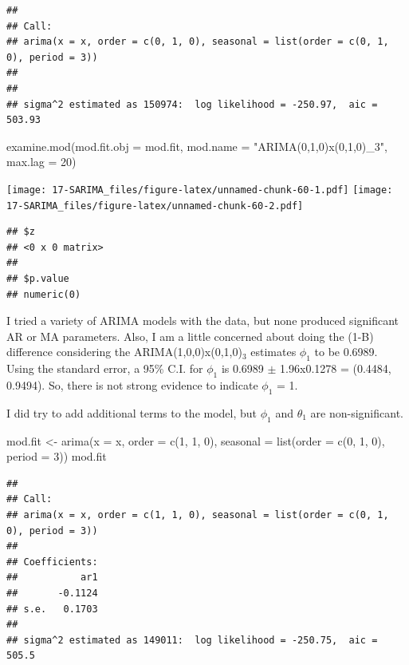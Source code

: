 \documentclass[
]{book}
\newenvironment{Shaded}{\begin{snugshade}}{\end{snugshade}}
\newcommand{\AttributeTok}[1]{\textcolor[rgb]{0.77,0.63,0.00}{#1}}
\newcommand{\DecValTok}[1]{\textcolor[rgb]{0.00,0.00,0.81}{#1}}
\newcommand{\FunctionTok}[1]{\textcolor[rgb]{0.00,0.00,0.00}{#1}}
\newcommand{\NormalTok}[1]{#1}
\newcommand{\OtherTok}[1]{\textcolor[rgb]{0.56,0.35,0.01}{#1}}
\newcommand{\StringTok}[1]{\textcolor[rgb]{0.31,0.60,0.02}{#1}}
\theoremstyle{definition}
\theoremstyle{definition}
\theoremstyle{definition}
\theoremstyle{definition}
\theoremstyle{remark}
\begin{document}
\begin{verbatim}
## 
## Call:
## arima(x = x, order = c(0, 1, 0), seasonal = list(order = c(0, 1, 0), period = 3))
## 
## 
## sigma^2 estimated as 150974:  log likelihood = -250.97,  aic = 503.93
\end{verbatim}

\begin{Shaded}
\begin{Highlighting}[]
  \FunctionTok{examine.mod}\NormalTok{(}\AttributeTok{mod.fit.obj =}\NormalTok{ mod.fit, }\AttributeTok{mod.name =} \StringTok{"ARIMA(0,1,0)x(0,1,0)\_3"}\NormalTok{, }\AttributeTok{max.lag =} \DecValTok{20}\NormalTok{)}
\end{Highlighting}
\end{Shaded}

\texttt{[image: 17-SARIMA\_files/figure-latex/unnamed-chunk-60-1.pdf]} \texttt{[image: 17-SARIMA\_files/figure-latex/unnamed-chunk-60-2.pdf]}

\begin{verbatim}
## $z
## <0 x 0 matrix>
## 
## $p.value
## numeric(0)
\end{verbatim}

I tried a variety of ARIMA models with the data, but none produced significant AR or MA parameters. Also, I am a little concerned about doing the (1-B) difference considering the ARIMA(1,0,0)x(0,1,0)\(_3\) estimates \(\phi_1\) to be 0.6989. Using the standard error, a 95\% C.I. for \(\phi_1\) is 0.6989 \(\pm\) 1.96x0.1278 = (0.4484, 0.9494). So, there is not strong evidence to indicate \(\phi_1\) = 1.

I did try to add additional terms to the model, but \(\phi_1\) and \(\theta_1\) are non-significant.

\begin{Shaded}
\begin{Highlighting}[]
\NormalTok{mod.fit }\OtherTok{\textless{}{-}} \FunctionTok{arima}\NormalTok{(}\AttributeTok{x =}\NormalTok{ x, }\AttributeTok{order =} \FunctionTok{c}\NormalTok{(}\DecValTok{1}\NormalTok{, }\DecValTok{1}\NormalTok{, }\DecValTok{0}\NormalTok{), }\AttributeTok{seasonal =} \FunctionTok{list}\NormalTok{(}\AttributeTok{order =} \FunctionTok{c}\NormalTok{(}\DecValTok{0}\NormalTok{, }\DecValTok{1}\NormalTok{, }\DecValTok{0}\NormalTok{), }\AttributeTok{period =} \DecValTok{3}\NormalTok{))}
\NormalTok{  mod.fit}
\end{Highlighting}
\end{Shaded}

\begin{verbatim}
## 
## Call:
## arima(x = x, order = c(1, 1, 0), seasonal = list(order = c(0, 1, 0), period = 3))
## 
## Coefficients:
##           ar1
##       -0.1124
## s.e.   0.1703
## 
## sigma^2 estimated as 149011:  log likelihood = -250.75,  aic = 505.5
\end{verbatim}
\end{document}
